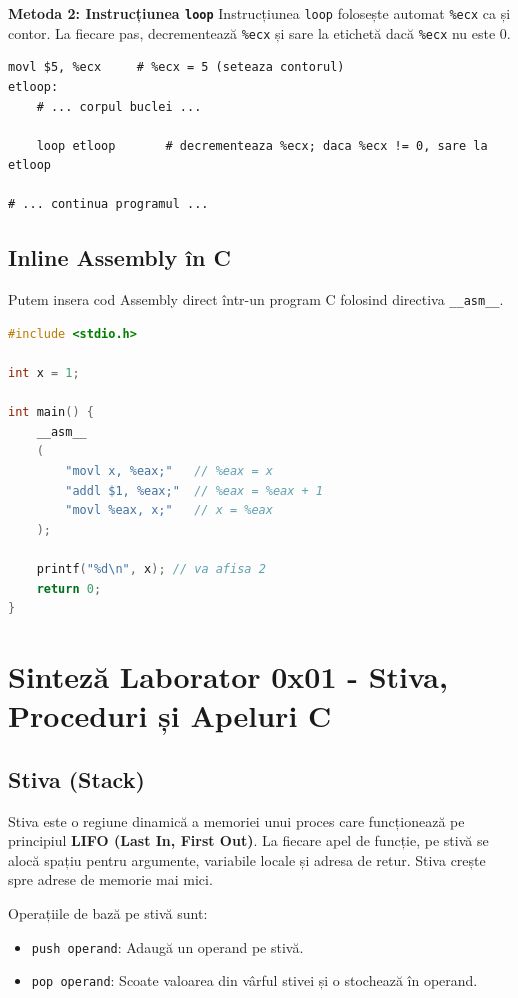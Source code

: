 \documentclass[12pt,a4paper]{article}
\begin{document}
\textbf{Metoda 2: Instrucțiunea \texttt{loop}}
Instrucțiunea \texttt{loop} folosește automat \texttt{\%ecx} ca și contor. La fiecare pas, decrementează \texttt{\%ecx} și sare la etichetă dacă \texttt{\%ecx} nu este 0.

\begin{lstlisting}[language=x86asm]
    movl $5, %ecx     # %ecx = 5 (seteaza contorul)
etloop:
    # ... corpul buclei ...
    
    loop etloop       # decrementeaza %ecx; daca %ecx != 0, sare la etloop
    
# ... continua programul ...
\end{lstlisting}

\subsection{Inline Assembly în C}
Putem insera cod Assembly direct într-un program C folosind directiva \texttt{\_\_asm\_\_}.

\begin{lstlisting}[language=c]
#include <stdio.h>

int x = 1;

int main() {
    __asm__
    (
        "movl x, %eax;"   // %eax = x
        "addl $1, %eax;"  // %eax = %eax + 1
        "movl %eax, x;"   // x = %eax
    );
    
    printf("%d\n", x); // va afisa 2
    return 0;
}
\end{lstlisting}

\newpage
\section{Sinteză Laborator 0x01 - Stiva, Proceduri și Apeluri C}

\subsection{Stiva (Stack)}
Stiva este o regiune dinamică a memoriei unui proces care funcționează pe principiul \textbf{LIFO (Last In, First Out)}. La fiecare apel de funcție, pe stivă se alocă spațiu pentru argumente, variabile locale și adresa de retur. Stiva crește spre adrese de memorie mai mici.

Operațiile de bază pe stivă sunt:
\begin{itemize}
    \item \texttt{push operand}: Adaugă un operand pe stivă.
    \item \texttt{pop operand}: Scoate valoarea din vârful stivei și o stochează în operand.
\end{itemize}
\end{document}
